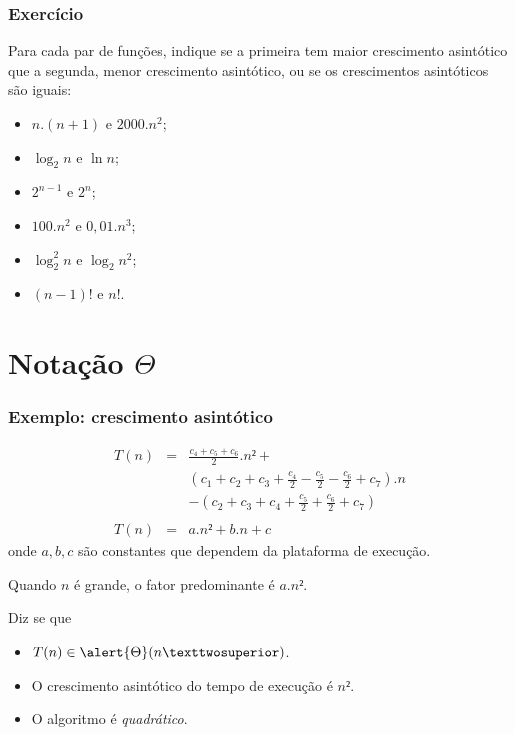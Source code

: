 \documentclass{beamer}
\begin{document}
\begin{frame}
\frametitle{Exercício}

Para cada par de funções, indique se a primeira tem maior crescimento asintótico
que a segunda, menor crescimento asintótico, ou se os crescimentos asintóticos
são iguais:
\begin{itemize}
\item $n.(n+1)$ e $2000.n^2$;
\item $\log_2 n$ e $\ln n$;
\item $2^{n-1}$ e $2^n$;
\item $100.n^2$ e $0,01.n^3$;
\item $\log_2^2 n$ e $\log_2 n^2$;
\item $(n-1)!$ e $n!$.
\end{itemize}

\end{frame}

\section{Notação $\Theta$}

\begin{frame}

\frametitle{Exemplo: crescimento asintótico}

  $$
  \begin{array}{rcl}
    T(n)
    & = & \frac{c_4+c_5+c_6}{2}.n² + \\
    & &   (c_1+c_2+c_3+\frac{c_4}{2}-\frac{c_5}{2}-\frac{c_6}{2} + c_7).n \\
    & & - (c_2 + c_3 + c_4 + \frac{c_5}{2} + \frac{c_6}{2} + c_7) \\
    \\
    T(n) & = & a.n² + b.n + c
  \end{array}
  $$
  onde $a, b, c$ são constantes que dependem da plataforma de execução.

  Quando $n$ é grande, o fator predominante é $a.n²$.

  Diz se que
  
  \begin{itemize}

    \item $T(n) \in \alert{\Theta}(n²)$.

    \item O crescimento asintótico do tempo de execução é $n²$.

    \item O algoritmo é \emph{quadrático}.

  \end{itemize}
  
\end{frame}
\end{document}
